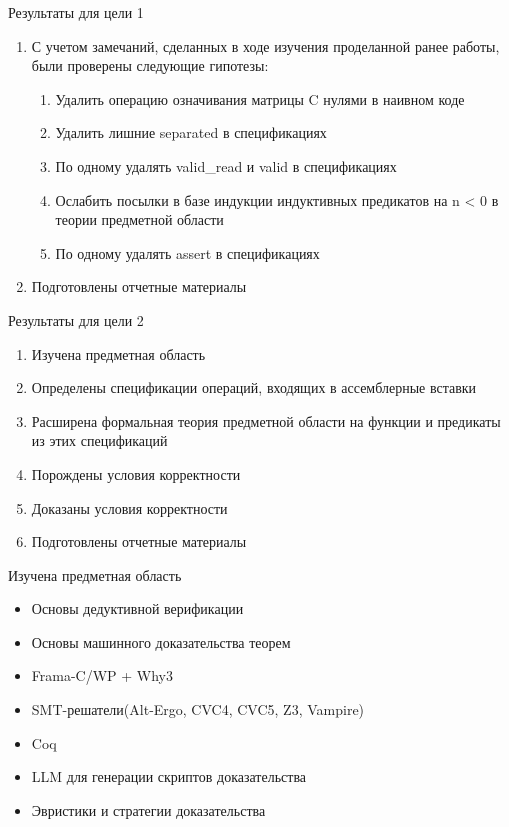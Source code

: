 \documentclass[aspectratio=169, 11pt]{beamer}
\begin{document}
\begin{frame}{Результаты для цели 1}
	\begin{enumerate}
		\item С учетом замечаний, сделанных в ходе изучения проделанной ранее работы, были проверены следующие гипотезы:
		\begin{enumerate}
			\item {} Удалить операцию означивания матрицы C нулями в наивном коде
			\item {} Удалить лишние separated в спецификациях
			\item {} По одному удалять valid\_read и valid в спецификациях
			\item {} Ослабить посылки в базе индукции индуктивных предикатов на n < 0 в теории предметной области
			\item {} По одному удалять assert в спецификациях
		\end{enumerate}
		\item Подготовлены отчетные материалы
	\end{enumerate}
\end{frame}


\begin{frame}{Результаты для цели 2}
	\begin{enumerate}
		\item Изучена предметная область
		\item Определены спецификации операций, входящих в ассемблерные вставки
		\item Расширена формальная теория предметной области на функции и предикаты из этих спецификаций
		\item Порождены условия корректности
		\item Доказаны условия корректности
		\item Подготовлены отчетные материалы
	\end{enumerate}

\end{frame}


\begin{frame}{Изучена предметная область}
    \begin{itemize}
        \item Основы дедуктивной верификации
        \item Основы машинного доказательства теорем
        \item Frama-C/WP + Why3
        \item SMT-решатели(Alt-Ergo, CVC4, CVC5, Z3, Vampire)
        \item Coq
        \item LLM для генерации скриптов доказательства
        \item Эвристики и стратегии доказательства
    \end{itemize}
\end{frame}
\end{document}
